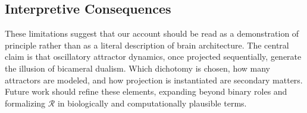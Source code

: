 \documentclass[a4paper,11pt]{article}
\begin{document}
\subsection{Interpretive Consequences}
These limitations suggest that our account should be read as a demonstration of
principle rather than as a literal description of brain architecture. The
central claim is that oscillatory attractor dynamics, once projected
sequentially, generate the illusion of bicameral dualism. Which dichotomy is
chosen, how many attractors are modeled, and how projection is instantiated are
secondary matters. Future work should refine these elements, expanding beyond
binary roles and formalizing $\mathcal{R}$ in biologically and computationally
plausible terms.



\end{document}

